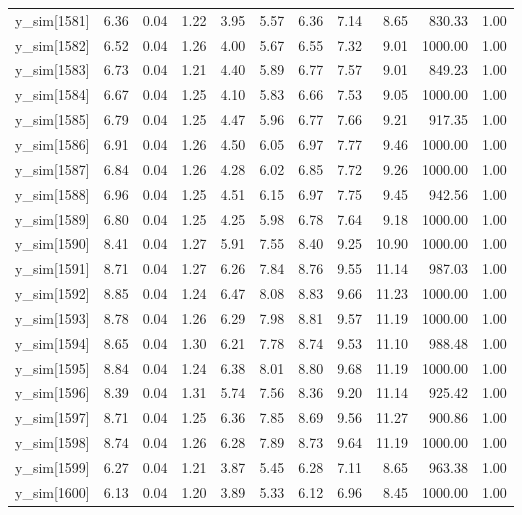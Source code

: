 \begin{table}[ht]
\begin{tabular}{rrrrrrrrrrr}
  y\_sim[1581] & 6.36 & 0.04 & 1.22 & 3.95 & 5.57 & 6.36 & 7.14 & 8.65 & 830.33 & 1.00 \\ 
  y\_sim[1582] & 6.52 & 0.04 & 1.26 & 4.00 & 5.67 & 6.55 & 7.32 & 9.01 & 1000.00 & 1.00 \\ 
  y\_sim[1583] & 6.73 & 0.04 & 1.21 & 4.40 & 5.89 & 6.77 & 7.57 & 9.01 & 849.23 & 1.00 \\ 
  y\_sim[1584] & 6.67 & 0.04 & 1.25 & 4.10 & 5.83 & 6.66 & 7.53 & 9.05 & 1000.00 & 1.00 \\ 
  y\_sim[1585] & 6.79 & 0.04 & 1.25 & 4.47 & 5.96 & 6.77 & 7.66 & 9.21 & 917.35 & 1.00 \\ 
  y\_sim[1586] & 6.91 & 0.04 & 1.26 & 4.50 & 6.05 & 6.97 & 7.77 & 9.46 & 1000.00 & 1.00 \\ 
  y\_sim[1587] & 6.84 & 0.04 & 1.26 & 4.28 & 6.02 & 6.85 & 7.72 & 9.26 & 1000.00 & 1.00 \\ 
  y\_sim[1588] & 6.96 & 0.04 & 1.25 & 4.51 & 6.15 & 6.97 & 7.75 & 9.45 & 942.56 & 1.00 \\ 
  y\_sim[1589] & 6.80 & 0.04 & 1.25 & 4.25 & 5.98 & 6.78 & 7.64 & 9.18 & 1000.00 & 1.00 \\ 
  y\_sim[1590] & 8.41 & 0.04 & 1.27 & 5.91 & 7.55 & 8.40 & 9.25 & 10.90 & 1000.00 & 1.00 \\ 
  y\_sim[1591] & 8.71 & 0.04 & 1.27 & 6.26 & 7.84 & 8.76 & 9.55 & 11.14 & 987.03 & 1.00 \\ 
  y\_sim[1592] & 8.85 & 0.04 & 1.24 & 6.47 & 8.08 & 8.83 & 9.66 & 11.23 & 1000.00 & 1.00 \\ 
  y\_sim[1593] & 8.78 & 0.04 & 1.26 & 6.29 & 7.98 & 8.81 & 9.57 & 11.19 & 1000.00 & 1.00 \\ 
  y\_sim[1594] & 8.65 & 0.04 & 1.30 & 6.21 & 7.78 & 8.74 & 9.53 & 11.10 & 988.48 & 1.00 \\ 
  y\_sim[1595] & 8.84 & 0.04 & 1.24 & 6.38 & 8.01 & 8.80 & 9.68 & 11.19 & 1000.00 & 1.00 \\ 
  y\_sim[1596] & 8.39 & 0.04 & 1.31 & 5.74 & 7.56 & 8.36 & 9.20 & 11.14 & 925.42 & 1.00 \\ 
  y\_sim[1597] & 8.71 & 0.04 & 1.25 & 6.36 & 7.85 & 8.69 & 9.56 & 11.27 & 900.86 & 1.00 \\ 
  y\_sim[1598] & 8.74 & 0.04 & 1.26 & 6.28 & 7.89 & 8.73 & 9.64 & 11.19 & 1000.00 & 1.00 \\ 
  y\_sim[1599] & 6.27 & 0.04 & 1.21 & 3.87 & 5.45 & 6.28 & 7.11 & 8.65 & 963.38 & 1.00 \\ 
  y\_sim[1600] & 6.13 & 0.04 & 1.20 & 3.89 & 5.33 & 6.12 & 6.96 & 8.45 & 1000.00 & 1.00 \\ 

\end{tabular}
\end{table}
